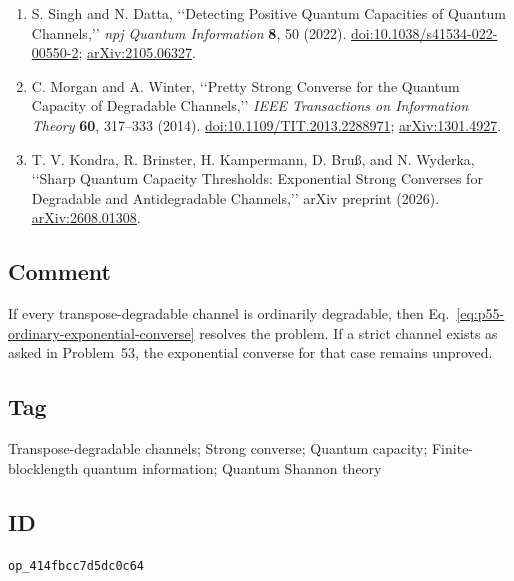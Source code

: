 \begin{enumerate}[label={},leftmargin=4.8em,labelsep=0.5em]
  \footnotesize
  \item[\textup{[SD22]}]\label{ref:p55-singh-datta}
  S. Singh and N. Datta,
  \lq\lq Detecting Positive Quantum Capacities of Quantum Channels,\rq\rq{}
  \emph{npj Quantum Information} \textbf{8}, 50 (2022).
  \href{https://doi.org/10.1038/s41534-022-00550-2}%
       {doi:10.1038/s41534-022-00550-2};
  \href{https://arxiv.org/abs/2105.06327}{arXiv:2105.06327}.

  \item[\textup{[MW14]}]\label{ref:p55-morgan-winter}
  C. Morgan and A. Winter,
  \lq\lq Pretty Strong Converse for the Quantum Capacity of Degradable
  Channels,\rq\rq{} \emph{IEEE Transactions on Information Theory}
  \textbf{60}, 317--333 (2014).
  \href{https://doi.org/10.1109/TIT.2013.2288971}%
       {doi:10.1109/TIT.2013.2288971};
  \href{https://arxiv.org/abs/1301.4927}{arXiv:1301.4927}.

  \item[\textup{[KBK+26]}]\label{ref:p55-kondra-et-al}
  T. V. Kondra, R. Brinster, H. Kampermann, D. Bru{\ss}, and N. Wyderka,
  \lq\lq Sharp Quantum Capacity Thresholds: Exponential Strong Converses for
  Degradable and Antidegradable Channels,\rq\rq{} arXiv preprint (2026).
  \href{https://arxiv.org/abs/2608.01308}{arXiv:2608.01308}.
\end{enumerate}

\subsection*{Comment}

If every transpose-degradable channel is ordinarily degradable, then
Eq.~\eqref{eq:p55-ordinary-exponential-converse} resolves the problem.  If a
strict channel exists as asked in Problem~53, the exponential converse for
that case remains unproved.

\subsection*{Tag}

Transpose-degradable channels; Strong converse; Quantum capacity;
Finite-blocklength quantum information; Quantum Shannon theory

\subsection*{ID}

\texttt{op\_414fbcc7d5dc0c64}
